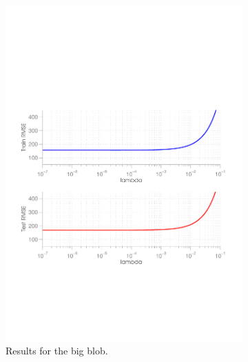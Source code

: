 \begin{figure}[ht]
  \centering
  \begin{subfigure}[b]{0.45\textwidth}
   \includegraphics[width=\textwidth]{figures/lambda_curve1.pdf}
    \caption{Results for the big blob.}
    \label{fig:lambda1}
  \end{subfigure}
  \hfill
  \begin{subfigure}[b]{0.45\textwidth}

\end{subfigure}
\end{figure}
